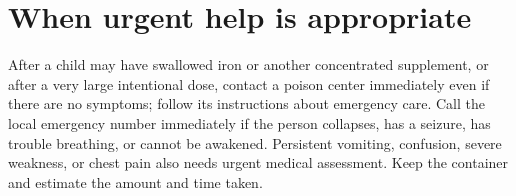 \section{When urgent help is appropriate}
After a child may have swallowed iron or another concentrated supplement, or after a very large intentional dose, contact a poison center immediately even if there are no symptoms; follow its instructions about emergency care. Call the local emergency number immediately if the person collapses, has a seizure, has trouble breathing, or cannot be awakened. Persistent vomiting, confusion, severe weakness, or chest pain also needs urgent medical assessment. Keep the container and estimate the amount and time taken. \cite{odsIron,poisonControl}


